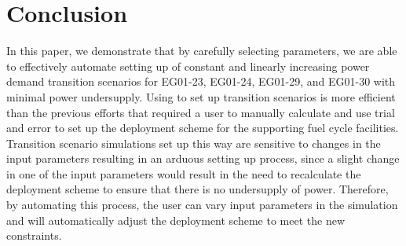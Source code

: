 \section{Conclusion}
In this paper, we demonstrate that by carefully selecting 
\deploy parameters, we are able to 
effectively automate setting up of constant and 
linearly increasing power demand transition scenarios
for EG01-23, EG01-24, EG01-29, and EG01-30 with minimal 
power undersupply. 
Using \deploy to set up transition scenarios 
is more efficient than the previous efforts that
required a user to manually calculate and use trial and error 
to set up the deployment scheme for the supporting fuel cycle 
facilities. 
Transition scenario simulations set up this way are sensitive 
to changes in the input parameters resulting in an 
arduous setting up process, since a slight change in one 
of the input parameters would result in the need to recalculate 
the deployment scheme to ensure that there is no undersupply 
of power.   
Therefore, by automating this process, the user can vary input parameters 
in the simulation and \deploy will automatically adjust the
deployment scheme to meet the new constraints. 